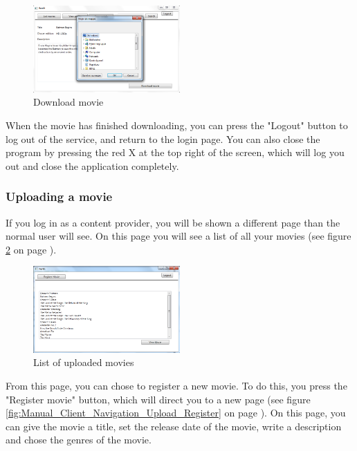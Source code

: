 \begin{figure}[h!]  
  \centering
\includegraphics[width=0.5\textwidth]{Parts/Images/Manual/Downloadmovie}
\caption{Download movie}
\label{fig:Manual_Client_Navigation_Rent_Download}
\end{figure}
 
When the movie has finished downloading, you can press the "Logout" button to log out of the service, and return to the login page. You can also close the program by pressing the red X at the top right of the screen, which will log you out and close the application completely.

\subsubsection{Uploading a movie}
\label{Manual_Client_Navigation_Upload}

If you log in as a content provider, you will be shown a different page than the normal user will see. On this page you will see a list of all your movies (see figure
\ref{fig:Manual_Client_Navigation_Upload_List} on page \pageref{fig:Manual_Client_Navigation_Upload_List}).

\begin{figure}[h!]  
  \centering
\includegraphics[width=0.5\textwidth]{Parts/Images/Manual/CPmovielist}
\caption{List of uploaded movies}
\label{fig:Manual_Client_Navigation_Upload_List}
\end{figure}
 
From this page, you can chose to register a new movie. To do this, you press the "Register movie" button, which will direct you to a new page (see figure \ref{fig:Manual_Client_Navigation_Upload_Register} on page \pageref{fig:Manual_Client_Navigation_Upload_Register}). On this page, you can give the movie a title, set the release date of the movie, write a description and chose the genres of the movie. 

